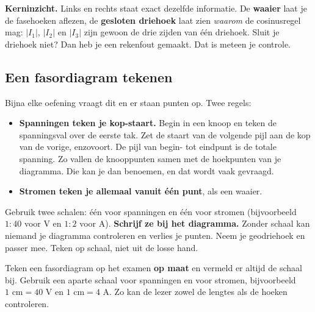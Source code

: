 \documentclass[a4paper,11pt]{article}
\begin{document}
\begin{oefening}
    \textbf{Kerninzicht.} Links en rechts staat exact dezelfde informatie. De \textbf{waaier} laat je
    de fasehoeken aflezen, de \textbf{gesloten driehoek} laat zien \emph{waarom} de cosinusregel mag:
    $|I_1|$, $|I_2|$ en $|I_3|$ zijn gewoon de drie zijden van \'e\'en driehoek. Sluit je driehoek
    niet? Dan heb je een rekenfout gemaakt. Dat is meteen je controle.
\end{oefening}

\subsection{Een fasordiagram tekenen}

Bijna elke oefening vraagt dit en er staan punten op. Twee regels:

\begin{itemize}
    \item \textbf{Spanningen teken je kop-staart.} Begin in een knoop en teken de spanningsval over
          de eerste tak. Zet de staart van de volgende pijl aan de kop van de vorige, enzovoort.
          De pijl van begin- tot eindpunt is de totale spanning. Zo vallen de knooppunten samen
          met de hoekpunten van je diagramma. Die kan je dan benoemen, en dat wordt vaak
          gevraagd.
    \item \textbf{Stromen teken je allemaal vanuit één punt}, als een waaier.
\end{itemize}

Gebruik twee schalen: één voor spanningen en één voor stromen (bijvoorbeeld $1:40$ voor V en
$1:2$ voor A). \textbf{Schrijf ze bij het diagramma.} Zonder schaal kan niemand je diagramma
controleren en verlies je punten. Neem je geodriehoek en passer mee. Teken op schaal, niet uit de
losse hand.

\begin{examenbox}
    Teken een fasordiagram op het examen \textbf{op maat} en vermeld er altijd de schaal bij.
    Gebruik een aparte schaal voor spanningen en voor stromen, bijvoorbeeld
    $1\text{ cm}=40\text{ V}$ en $1\text{ cm}=4\text{ A}$. Zo kan de lezer zowel de lengtes
    als de hoeken controleren.
\end{examenbox}
\end{document}
